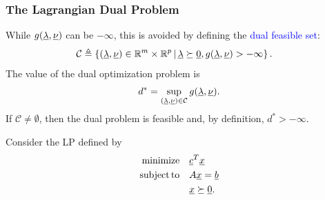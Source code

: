 \documentclass[10pt,english,aspectratio=169]{beamer}
\begin{document}
\begin{frame} \frametitle{The Lagrangian Dual Problem}

While $g(\underline{\lambda},\underline{\nu})$ can be $-\infty$, this is avoided by defining the \textcolor{blue}{dual feasible set}:
\begin{align*}
\mathcal{C} &\triangleq \left\{ (\underline{\lambda},\underline{\nu}) \in \mathbb{R}^m \times \mathbb{R}^p \,|\, \underline{\lambda}\succeq \underline{0},  g(\underline{\lambda},\underline{\nu}) > -\infty \right\}.
\end{align*}
The value of the dual optimization problem is \vspace{-1mm}
\[ d^* = \sup_{(\vecnot{\lambda},\vecnot{\nu})\in \mathcal{C}} g(\vecnot{\lambda},\vecnot{\nu}). \vspace{-1mm} \]
If $\mathcal{C} \neq \emptyset$, then the dual problem is feasible and, by definition, $d^* > -\infty$.

\vspace{6mm}

Consider the LP defined by \vspace{-2mm}
\begin{align*}
\mathrm{minimize} \quad & \underline{c}^T \underline{x} \\
\mathrm{subject\,to} \quad & A \underline{x} = \underline{b} \\
& \underline{x} \succeq \underline{0}.
\end{align*}

\end{frame}
\end{document}
